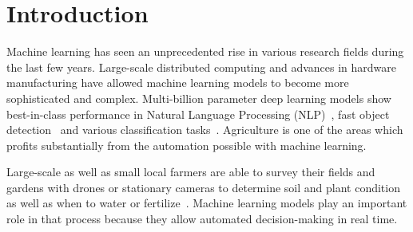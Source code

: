 \documentclass[draft,final]{vutinfth} %
\begin{document}
\frontmatter %

\addstatementpage

\begin{danksagung*}
\end{danksagung*}

\begin{acknowledgements*}
\end{acknowledgements*}

\begin{kurzfassung}
\end{kurzfassung}

\begin{abstract}
\end{abstract}


\tableofcontents %

\mainmatter

\chapter{Introduction}
\label{chap:introduction}

Machine learning has seen an unprecedented rise in various research
fields during the last few years. Large-scale distributed computing
and advances in hardware manufacturing have allowed machine learning
models to become more sophisticated and complex. Multi-billion
parameter deep learning models show best-in-class performance in
Natural Language Processing (NLP)~\cite{brown2020}, fast object
detection~\cite{bochkovskiy2020} and various classification
tasks~\cite{zhong2022,ariss2022}. Agriculture is one of the areas
which profits substantially from the automation possible with machine
learning.

Large-scale as well as small local farmers are able to survey their
fields and gardens with drones or stationary cameras to determine soil
and plant condition as well as when to water or
fertilize~\cite{ramos-giraldo2020}. Machine learning models play an
important role in that process because they allow automated
decision-making in real time.
\end{document}
